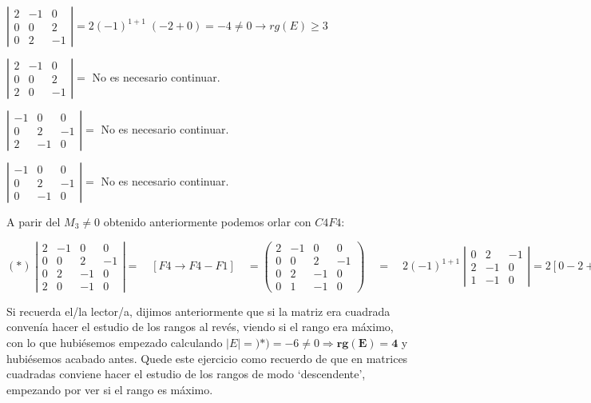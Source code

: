 \begin{proofw}
\noindent $\left| \begin{matrix} 2&\boxed{-1}&\boxed{0}\\0&\boxed{0}&\boxed{2}\\0&2&-1 \end{matrix} \right| = 2(-1)^{1+1}\; (-2+0)=-4\neq 0 \to rg(E)\ge 3$

\noindent $\left| \begin{matrix} 2&\boxed{-1}&\boxed{0}\\0&\boxed{0}&\boxed{2}\\2&0&-1 \end{matrix} \right| = $ No es necesario continuar.

\noindent $\left| \begin{matrix} \boxed{-1}&\boxed{0}&0\\ \boxed{0}&\boxed{2}&-1 \\2&-1&0 \end{matrix} \right| = $ No es necesario continuar.

\noindent $\left| \begin{matrix} \boxed{-1}&\boxed{0}&0\\ \boxed{0}&\boxed{2}&-1\\0&-1&0 \end{matrix} \right| = $ No es necesario continuar.

\noindent A parir del $M_3\neq 0$ obtenido anteriormente podemos orlar con $C4F4$:

\noindent $(*)\; \left| \begin{matrix} 2&-1&0&0\\0&0&2&-1\\0&2&-1&0\\2&0&-1&0  \end{matrix} \right| = \quad [F4\to F4-F1]\quad = \left( \begin{matrix} 2&-1&0&0\\0&0&2&-1\\0&2&-1&0\\0&1&-1&0  \end{matrix} \right)\quad = \quad 2 (-1)^{1+1} \; \left| \begin{matrix} 0&2&-1\\2&-1&0\\ 1&-1&0 \end{matrix} \right|= 2 [0-2+0-(1+0+0)]=2\cdot(-3)=-6\neq 0 \Rightarrow \boldsymbol{rg(E)=4}$

Si recuerda el/la lector/a, dijimos anteriormente que si la matriz era cuadrada convenía hacer el estudio de los rangos al revés, viendo si el rango era máximo, con lo que hubiésemos empezado calculando $|E|=)*)=-6\neq 0 \Rightarrow \boldsymbol{rg(E)=4}$ y hubiésemos acabado antes. Quede este ejercicio como recuerdo de que en matrices cuadradas conviene hacer el estudio de los rangos de modo `descendente', empezando por ver si el rango es máximo.

\end{proofw}


